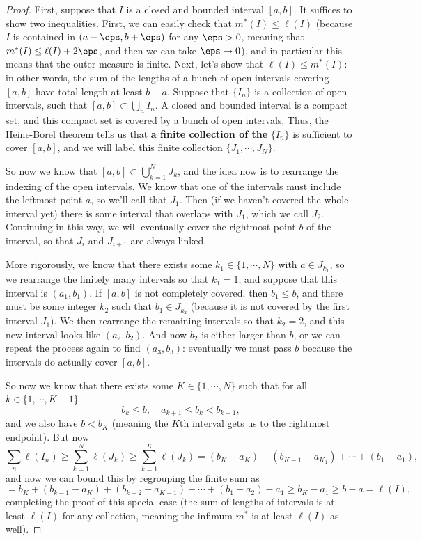 \begin{proof}
First, suppose that $I$ is a closed and bounded interval $[a, b]$. It suffices to show two inequalities. First, we can easily check that $m^\ast(I) \le \ell(I)$ (because $I$ is contained in $(a - \eps, b+\eps)$ for any $\eps > 0$, meaning that $m^\ast(I) \le \ell(I) + 2\eps$, and then we can take $\eps \to 0$), and in particular this means that the outer measure is finite. 
Next, let's show that $\ell(I) \le m^\ast(I)$: in other words, the sum of the lengths of a bunch of open intervals covering $[a, b]$ have total length at least $b-a$. Suppose that $\{I_n\}$ is a collection of open intervals, such that $[a, b] \subset \bigcup_n I_n$. A closed and bounded interval is a compact set, and this compact set is covered by a bunch of open intervals. Thus, the Heine-Borel theorem tells us that \textbf{a finite collection of the} $\{I_n\}$ is sufficient to cover $[a, b]$, and we will label this finite collection $\{J_1, \cdots, J_N\}$.

So now we know that $[a, b] \subset \bigcup_{k=1}^N J_k$, and the idea now is to rearrange the indexing of the open intervals. We know that one of the intervals must include the leftmost point $a$, so we'll call that $J_1$. Then (if we haven't covered the whole interval yet) there is some interval that overlaps with $J_1$, which we call $J_2$. Continuing in this way, we will eventually cover the rightmost point $b$ of the interval, so that $J_i$ and $J_{i+1}$ are always linked. 

More rigorously, we know that there exists some $k_1 \in \{1, \cdots, N\}$ with $a \in J_{k_1}$, so we rearrange the finitely many intervals so that $k_1 = 1$, and suppose that this interval is $(a_1, b_1)$. If $[a, b]$ is not completely covered, then $b_1 \le b$, and there must be some integer $k_2$ such that $b_1 \in J_{k_2}$ (because it is not covered by the first interval $J_1$). We then rearrange the remaining intervals so that $k_2 = 2$, and this new interval looks like $(a_2, b_2)$. And now $b_2$ is either larger than $b$, or we can repeat the process again to find $(a_3, b_3)$: eventually we must pass $b$ because the intervals do actually cover $[a, b]$. 

So now we know that there exists some $K \in \{1, \cdots, N\}$ such that for all $k \in \{1, \cdots, K-1\}$
\[
    b_k \le b, \quad a_{k+1} \le b_k < b_{k+1}, 
\]
and we also have $b < b_K$ (meaning the $K$th interval gets us to the rightmost endpoint). But now 
\[
    \sum_n \ell(I_n) \ge \sum_{k=1}^N \ell(J_k) \ge \sum_{k=1}^K \ell(J_k) = (b_K - a_K) + (b_{K-1} - a_{K_1}) + \cdots + (b_1 - a_1),
\]
and now we can bound this by regrouping the finite sum as
\[
    = b_K + (b_{k-1} - a_K) + (b_{k-2} - a_{K-1}) + \cdots + (b_1 - a_2) - a_1 \ge b_K - a_1 \ge b - a = \ell(I),
\]
completing the proof of this special case (the sum of lengths of intervals is at least $\ell(I)$ for any collection, meaning the infimum $m^\ast$ is at least $\ell(I)$ as well). 


\end{proof}
